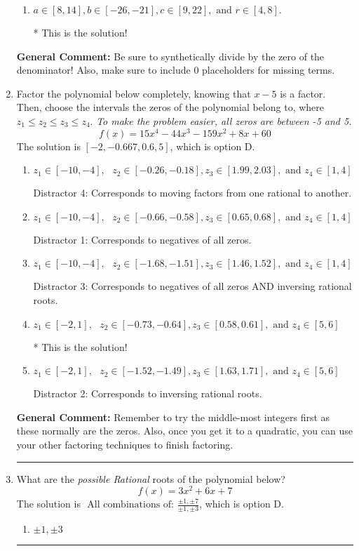 \documentclass{extbook}[14pt]
\newcommand{\litem}[1]{\item #1

\rule{\textwidth}{0.4pt}}
\begin{document}
\begin{enumerate}
{\begin{enumerate}[label=\Alph*.]
 You divided by the opposite of the factor.
\item \( a \in [8, 14], b \in [-26, -21], c \in [9, 22], \text{ and } r \in [4, 8]. \)

* This is the solution!
\end{enumerate}

\textbf{General Comment:} Be sure to synthetically divide by the zero of the denominator! Also, make sure to include 0 placeholders for missing terms.
}
\litem{
Factor the polynomial below completely, knowing that $x -5$ is a factor. Then, choose the intervals the zeros of the polynomial belong to, where $z_1 \leq z_2 \leq z_3 \leq z_4$. \textit{To make the problem easier, all zeros are between -5 and 5.}
\[ f(x) = 15x^{4} -44 x^{3} -159 x^{2} +8 x + 60 \]The solution is \( [-2, -0.667, 0.6, 5] \), which is option D.\begin{enumerate}[label=\Alph*.]
\item \( z_1 \in [-10, -4], \text{   }  z_2 \in [-0.26, -0.18], z_3 \in [1.99, 2.03], \text{   and   } z_4 \in [1, 4] \)

 Distractor 4: Corresponds to moving factors from one rational to another.
\item \( z_1 \in [-10, -4], \text{   }  z_2 \in [-0.66, -0.58], z_3 \in [0.65, 0.68], \text{   and   } z_4 \in [1, 4] \)

 Distractor 1: Corresponds to negatives of all zeros.
\item \( z_1 \in [-10, -4], \text{   }  z_2 \in [-1.68, -1.51], z_3 \in [1.46, 1.52], \text{   and   } z_4 \in [1, 4] \)

 Distractor 3: Corresponds to negatives of all zeros AND inversing rational roots.
\item \( z_1 \in [-2, 1], \text{   }  z_2 \in [-0.73, -0.64], z_3 \in [0.58, 0.61], \text{   and   } z_4 \in [5, 6] \)

* This is the solution!
\item \( z_1 \in [-2, 1], \text{   }  z_2 \in [-1.52, -1.49], z_3 \in [1.63, 1.71], \text{   and   } z_4 \in [5, 6] \)

 Distractor 2: Corresponds to inversing rational roots.
\end{enumerate}

\textbf{General Comment:} Remember to try the middle-most integers first as these normally are the zeros. Also, once you get it to a quadratic, you can use your other factoring techniques to finish factoring.
}
\litem{
What are the \textit{possible Rational} roots of the polynomial below?
\[ f(x) = 3x^{2} +6 x + 7 \]The solution is \( \text{ All combinations of: }\frac{\pm 1,\pm 7}{\pm 1,\pm 3} \), which is option D.\begin{enumerate}[label=\Alph*.]
\item \( \pm 1,\pm 3 \)


\end{enumerate}}
\end{enumerate}
\end{document}
